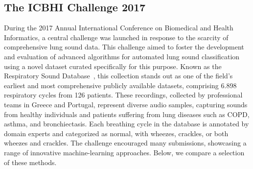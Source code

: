 \subsection{The ICBHI Challenge 2017}
During the 2017 Annual International Conference on Biomedical and Health Informatics, a central challenge was launched in response to the scarcity of comprehensive lung sound data. This challenge aimed to foster the development and evaluation of advanced algorithms for automated lung sound classification using a novel dataset curated specifically for this purpose. Known as the Respiratory Sound Database~\cite{rocha2018alpha}, this collection stands out as one of the field's earliest and most comprehensive publicly available datasets, comprising 6.898 respiratory cycles from 126 patients. These recordings, collected by professional teams in Greece and Portugal, represent diverse audio samples, capturing sounds from healthy individuals and patients suffering from lung diseases such as COPD, asthma, and bronchiectasis. Each breathing cycle in the database is annotated by domain experts and categorized as normal, with wheezes, crackles, or both wheezes and crackles. The challenge encouraged many submissions, showcasing a range of innovative machine-learning approaches. Below, we compare a selection of these methods.

